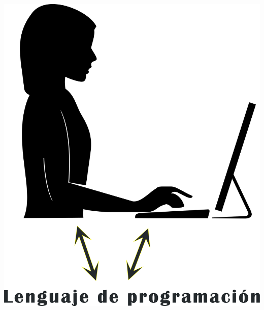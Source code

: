 \documentclass{beamer} %
\begin{document}
\begin{frame}{}
    \begin{center}
      \includegraphics[width=.7\textheight]{./image/cap1/humano-computador}
    \end{center}
\end{frame}
\end{document}
